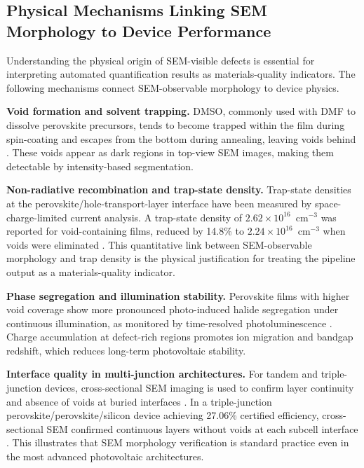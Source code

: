 \documentclass[pdflatex,sn-mathphys-num,iicol]{sn-jnl}
\theoremstyle{thmstyleone}
\theoremstyle{thmstyletwo}
\theoremstyle{thmstylethree}
\begin{document}
\subsection{Physical Mechanisms Linking SEM Morphology to Device Performance}
\label{subsec:physical_mechanisms}

Understanding the physical origin of SEM-visible defects is essential
for interpreting automated quantification results as materials-quality
indicators. The following mechanisms connect SEM-observable
morphology to device physics.

\textbf{Void formation and solvent trapping.}
DMSO, commonly used with DMF to dissolve perovskite precursors, tends
to become trapped within the film during spin-coating and escapes from
the bottom during annealing, leaving voids behind
\cite{chang2026,chen2021}. These voids appear as dark regions in
top-view SEM images, making them detectable by intensity-based
segmentation.

\textbf{Non-radiative recombination and trap-state density.}
Trap-state densities at the perovskite/hole-transport-layer interface
have been measured by space-charge-limited current analysis. A
trap-state density of $2.62 \times 10^{16}$~cm$^{-3}$ was reported
for void-containing films, reduced by 14.8\% to
$2.24 \times 10^{16}$~cm$^{-3}$ when voids were eliminated
\cite{chang2026}. This quantitative link between SEM-observable
morphology and trap density is the physical justification for
treating the pipeline output as a materials-quality indicator.

\textbf{Phase segregation and illumination stability.}
Perovskite films with higher void coverage show more pronounced
photo-induced halide segregation under continuous illumination,
as monitored by time-resolved photoluminescence \cite{chang2026}.
Charge accumulation at defect-rich regions promotes ion migration
and bandgap redshift, which reduces long-term photovoltaic stability.

\textbf{Interface quality in multi-junction architectures.}
For tandem and triple-junction devices, cross-sectional SEM imaging
is used to confirm layer continuity and absence of voids at buried
interfaces \cite{zheng2025}. In a triple-junction
perovskite/perovskite/silicon device achieving 27.06\% certified
efficiency, cross-sectional SEM confirmed continuous layers without
voids at each subcell interface \cite{zheng2025}. This illustrates
that SEM morphology verification is standard practice even in the
most advanced photovoltaic architectures.
\end{document}
